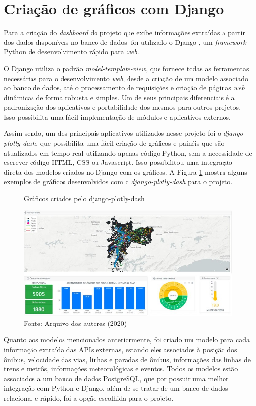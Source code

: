 \section{Criação de gráficos com Django}
\indent
\par Para a criação do \textit{dashboard} do projeto que exibe informações extraídas a partir dos dados disponíveis no banco de dados, foi utilizado o Django \cite{Django}, um \textit{framework} Python de desenvolvimento rápido para \textit{web}.
\indent
\par O Django utiliza o padrão \textit{model-template-view}, que fornece todas as ferramentas necessárias para o desenvolvimento \textit{web}, desde a criação de um modelo associado ao banco de dados, até o processamento de requisições e criação de páginas \textit{web} dinâmicas de forma robusta e simples. Um de seus principais diferenciais é a padronização dos aplicativos e portabilidade dos mesmos para outros projetos. Isso possibilita uma fácil implementação de módulos e aplicativos externos.
\indent
\par Assim sendo, um dos principais aplicativos utilizados nesse projeto foi o \textit{django-plotly-dash}, que possibilita uma fácil criação de gráficos e painéis que são atualizados em tempo real utilizando apenas código Python, sem a necessidade de escrever código HTML, CSS ou Javascript. Isso possibilitou uma integração direta dos modelos criados no Django com os gráficos. A Figura \ref{printDashboard} mostra alguns exemplos de gráficos desenvolvidos com o \textit{django-plotly-dash} para o projeto.
\begin{figure}[H]
    \centering
    \caption{Gráficos criados pelo django-plotly-dash}
    \includegraphics[width=1.0\linewidth]{Imagens/printDashboard.jpeg}
    \caption*{Fonte: Arquivo dos autores (2020)}
    \label{printDashboard}
\end{figure}
\indent
\par Quanto aos modelos mencionados anteriormente, foi criado um modelo para cada informação extraída das APIs externas, estando eles associados à posição dos ônibus, velocidade das vias, linhas e paradas de ônibus, informações das linhas de trens e metrôs, informações meteorológicas e eventos. Todos os modelos estão associados a um banco de dados PostgreSQL, que por possuir uma melhor integração com Python e Django, além de se tratar de um banco de dados relacional e rápido, foi a opção escolhida para o projeto.

